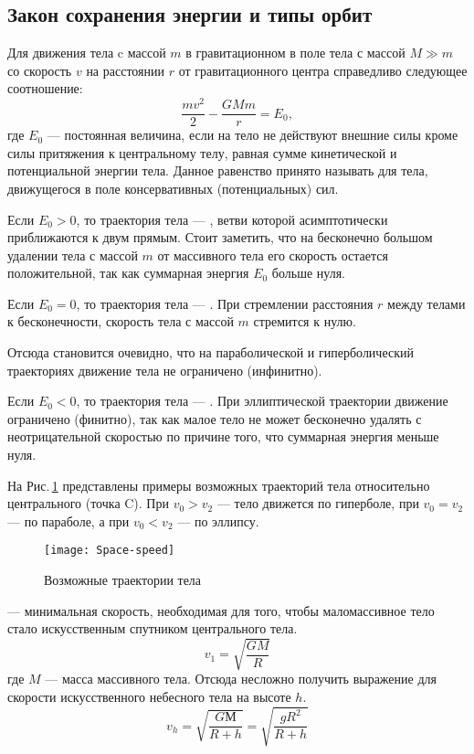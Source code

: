 \subsection{Закон сохранения энергии и типы орбит}
Для движения тела c массой $m$ в гравитационном  в поле тела 
с массой \linebreak $M\gg m$ со скорость $v$ на расстоянии $r$ от 
гравитационного центра справедливо следующее соотношение: 
\begin{equation}
\frac{m v^2}{2}-\frac{GM m }{r}=E_0,
\end{equation}
где $E_0$ --- постоянная величина, если на тело не действуют
внешние силы кроме силы притяжения к центральному телу, 
равная сумме кинетической и потенциальной энергии тела. Данное равенство принято называть  для тела, движущегося в поле консервативных (потенциальных) сил.

Если $E_0>0$, то траектория тела --- , 
ветви которой асимптотически приближаются к двум прямым. Стоит заметить,
что на бесконечно большом удалении тела с массой $m$ от массивного тела
его скорость остается положительной, так как суммарная энергия $E_0$ 
больше нуля.

Если $E_0=0$, то траектория тела --- . При стремлении
расстояния $r$ между телами к бесконечности, скорость тела с массой $m$ 
стремится к нулю.

Отсюда становится очевидно, что на параболической и гиперболический
 траекториях движение тела не ограничено (инфинитно). 

Если $E_0<0$, то траектория тела --- . При 
эллиптической траектории движение ограничено (финитно), так как малое тело
не может бесконечно удалять с неотрицательной скоростью по причине того,
что суммарная энергия меньше нуля.



На Рис.\,\ref{pic:orbits} представлены примеры возможных траекторий тела 
относительно центрального (точка C). При $v_0 > v_{2}$ --- тело движется 
по гиперболе, при $v_0 = v_{2}$ --- по параболе, 
а при $v_0 < v_{2}$ --- по эллипсу.\\

\begin{figure}[h!]
\centering
\texttt{[image: Space-speed]}
\caption{Возможные траектории тела \label{pic:orbits}}
\end{figure}

 --- минимальная скорость, необходимая для 
того, чтобы маломассивное тело стало искусственным спутником центрального тела.
\begin{equation}v_1=\sqrt{\frac{GM}{R}}
\end{equation}
где $M$ --- масса массивного тела. Отсюда несложно получить выражение для
скорости искусственного небесного тела на высоте 
$h$.\begin{equation}v_h=\sqrt{\frac{GМ}{R+h}}=\sqrt{\frac{gR^2}{R+h}}
\end{equation}\\

